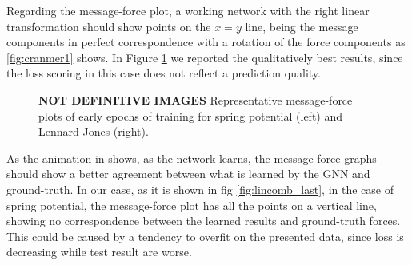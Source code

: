 \documentclass[../../master_thesis_np.tex]{subfiles}
\begin{document}
Regarding the message-force plot, a working network with the right linear transformation should show points on the $x = y$ line, being the message components in perfect correspondence with a rotation of the force components as \ref{fig:cranmer1} shows.
In Figure \ref{fig:lincomb} we reported the qualitatively best results, since the loss scoring in this case does not reflect a prediction quality.


\begin{figure}[tp]
	\centering
	\caption{\textbf{NOT DEFINITIVE IMAGES} Representative message-force plots of early epochs of training for spring potential (left) and Lennard Jones (right).}
	\label{fig:lincomb}
\end{figure}

As the animation in \cite{cranmer_discovering_2020} shows, as the network learns, the message-force graphs should show a better agreement between what is learned by the GNN and ground-truth.
In our case, as it is shown in fig \ref{fig:lincomb_last}, in the case of spring potential, the message-force plot has all the points on a vertical line, showing no correspondence between the learned results and ground-truth forces.
This could be caused by a tendency to overfit on the presented data, since loss is decreasing while test result are worse.
\end{document}
